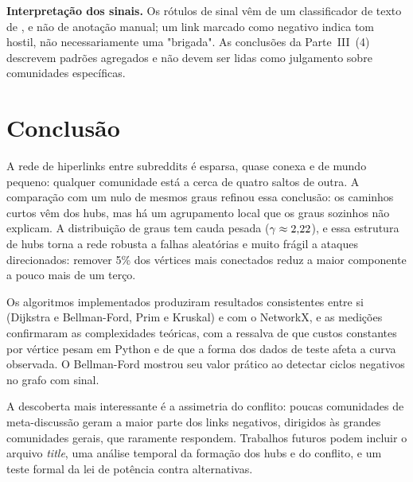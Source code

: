 \IfFileExists{webmedia.cls}{\webmediatrue\documentclass[sigconf]{webmedia}}{\documentclass[sigconf]{acmart}}
\begin{document}
\textbf{Interpretação dos sinais.} Os rótulos de sinal vêm de um classificador de texto de
\citet{kumar2018}, e não de anotação manual; um link marcado como negativo indica tom hostil, não
necessariamente uma "brigada". As conclusões da Parte~III~(4) descrevem padrões agregados e não devem
ser lidas como julgamento sobre comunidades específicas.

\section{Conclusão}
A rede de hiperlinks entre subreddits é esparsa, quase conexa e de mundo pequeno: qualquer comunidade
está a cerca de quatro saltos de outra. A comparação com um nulo de mesmos graus refinou essa
conclusão: os caminhos curtos vêm dos hubs, mas há um agrupamento local que os graus sozinhos não
explicam. A distribuição de graus tem cauda pesada ($\gamma \approx 2{,}22$), e essa estrutura de
hubs torna a rede robusta a falhas aleatórias e muito frágil a ataques direcionados: remover 5\% dos
vértices mais conectados reduz a maior componente a pouco mais de um terço.

Os algoritmos implementados produziram resultados consistentes entre si (Dijkstra e Bellman-Ford,
Prim e Kruskal) e com o NetworkX, e as medições confirmaram as complexidades teóricas, com a ressalva
de que custos constantes por vértice pesam em Python e de que a forma dos dados de teste afeta a curva
observada. O Bellman-Ford mostrou seu valor prático ao detectar ciclos negativos no grafo com sinal.

A descoberta mais interessante é a assimetria do conflito: poucas comunidades de meta-discussão geram
a maior parte dos links negativos, dirigidos às grandes comunidades gerais, que raramente respondem.
Trabalhos futuros podem incluir o arquivo \emph{title}, uma análise temporal da formação dos hubs e do
conflito, e um teste formal da lei de potência contra alternativas.



\end{document}
